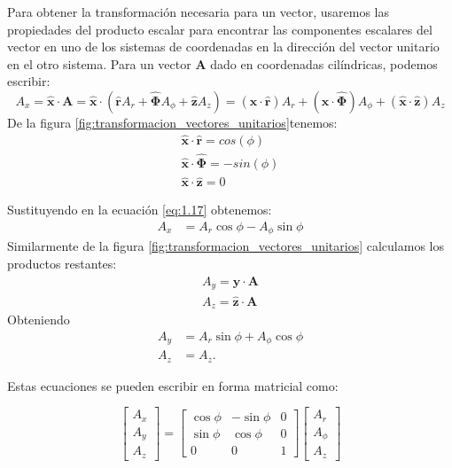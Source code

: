 \documentclass{book}
\begin{document}
Para obtener la transformación necesaria para un vector, usaremos las propiedades del producto escalar para encontrar las componentes escalares del vector en uno de los sistemas de coordenadas en la dirección del vector unitario en el otro sistema. Para un vector $\mathbf{A}$ dado en coordenadas cilíndricas, podemos escribir:
\begin{equation}
A_x=\mathbf{\hat{x}}\cdot\mathbf{A}=\mathbf{\hat{x}}\cdot(\mathbf{\hat{r}}A_r+\mathbf{\hat{\Phi}}A_\phi+\mathbf{\hat{z}}A_z)=(\mathbf{\hat{x}}\cdot\mathbf{\hat{r}})A_r+(\mathbf{\hat{x}}\cdot\mathbf{\hat{\Phi}})A_\phi+(\mathbf{\hat{x}}\cdot\mathbf{\hat{z}})A_z \label{eq:1.17}
\end{equation}
De la figura \ref{fig:transformacion_vectores_unitarios}tenemos:
\begin{align*}
    \mathbf{\hat{x}}\cdot\mathbf{\hat{r}}=cos(\phi)\\
    \mathbf{\hat{x}}\cdot\mathbf{\hat{\Phi}}=-sin(\phi)\\
    \mathbf{\hat{x}}\cdot\mathbf{\hat{z}}=0
\end{align*}
  
Sustituyendo en la ecuación \ref{eq:1.17} obtenemos:
\begin{align*}
A_x &= A_r \cos \phi - A_{\phi} \sin \phi
\end{align*}
Similarmente de la figura \ref{fig:transformacion_vectores_unitarios} calculamos los productos restantes:
\begin{align*}
    A_y=\mathbf{\hat{y}}\cdot\mathbf{{A}}\\
    A_z=\mathbf{\hat{z}}\cdot\mathbf{A}
    \end{align*}
Obteniendo 
\begin{align*}
A_y &= A_r \sin \phi + A_{\phi} \cos \phi\\
A_z &= A_z. 
\end{align*}


Estas ecuaciones se pueden escribir en forma matricial como:

\begin{equation}
\begin{bmatrix} A_x \\ A_y \\ A_z \end{bmatrix} = 
\begin{bmatrix} \cos \phi & -\sin \phi & 0 \\ \sin \phi & \cos \phi & 0 \\ 0 & 0 & 1 \end{bmatrix}
\begin{bmatrix} A_r \\ A_{\phi} \\ A_z \end{bmatrix}\label{eq:mat_cil_dir}
\end{equation}
\end{document}
